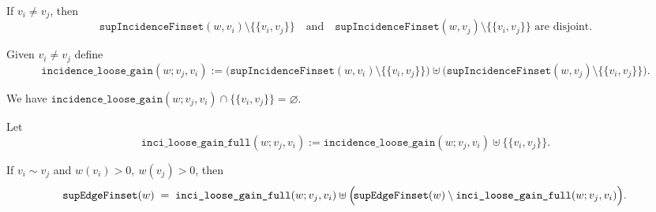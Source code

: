 \begin{lemma}\label{lem:disjoint-supported-incidence}
If $v_i\neq v_j$, then
\[
  \!\texttt{supIncidenceFinset}(w, v_i)\setminus\{\{v_i,v_j\}\}
  \quad\text{and}\quad
  \!\texttt{supIncidenceFinset}(w, v_j)\setminus\{\{v_i,v_j\}\}
  \text{ are disjoint.}
\]
\leanok
\end{lemma}

\begin{definition}\label{def:incidence-loose-gain}
Given $v_i\neq v_j$ define
\[
  \texttt{incidence\_loose\_gain}(w;v_j,v_i)
  := \bigl(\!\texttt{supIncidenceFinset}(w,v_i)\setminus\{\{v_i,v_j\}\}\bigr)
     \uplus
     \bigl(\!\texttt{supIncidenceFinset}(w,v_j)\setminus\{\{v_i,v_j\}\}\bigr).
\]
\leanok
\end{definition}

\begin{lemma}\label{lem:disjoint-inci-singleton}
We have
\(
  \texttt{incidence\_loose\_gain}(w;v_j,v_i)
  \cap \{\{v_i,v_j\}\} = \varnothing.
\)
\leanok
\end{lemma}

\begin{definition}\label{def:inci-loose-gain-full}
Let
\[
  \texttt{inci\_loose\_gain\_full}(w;v_j,v_i)
  := \texttt{incidence\_loose\_gain}(w;v_j,v_i)
     \uplus \{\{v_i,v_j\}\}.
\]
\leanok
\end{definition}

\begin{lemma}\label{lem:supported-edge-partition}
If $v_i\sim v_j$ and $w(v_i)>0,\ w(v_j)>0$, then
\[
  \!\texttt{supEdgeFinset}(w)
  \;=\;
  \texttt{inci\_loose\_gain\_full}(w;v_j,v_i)
  \uplus\Bigl(\!\texttt{supEdgeFinset}(w)\setminus \texttt{inci\_loose\_gain\_full}(w;v_j,v_i)\Bigr).
\]
\leanok
\end{lemma}

